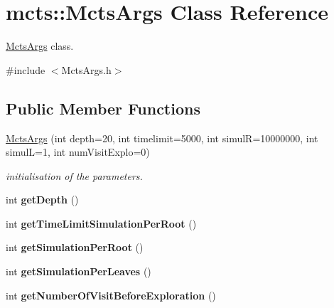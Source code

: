 \hypertarget{classmcts_1_1_mcts_args}{\section{mcts\+:\+:Mcts\+Args Class Reference}
\label{classmcts_1_1_mcts_args}
}


\hyperlink{classmcts_1_1_mcts_args}{Mcts\+Args} class.  




{\ttfamily \#include $<$Mcts\+Args.\+h$>$}

\subsection*{Public Member Functions}
\begin{DoxyCompactItemize}
\item 
\hyperlink{classmcts_1_1_mcts_args_a9bb463572768a550ac98a516ff785721}{Mcts\+Args} (int depth=20, int timelimit=5000, int simul\+R=10000000, int simul\+L=1, int num\+Visit\+Explo=0)
\begin{DoxyCompactList}\small\item\em initialisation of the parameters. \end{DoxyCompactList}\item 
\hypertarget{classmcts_1_1_mcts_args_a91c5f83242f98caca36bbc595d24a603}{int {\bfseries get\+Depth} ()}\label{classmcts_1_1_mcts_args_a91c5f83242f98caca36bbc595d24a603}

\item 
\hypertarget{classmcts_1_1_mcts_args_aa5f439f3b7bc032af73e14dcb1a875c9}{int {\bfseries get\+Time\+Limit\+Simulation\+Per\+Root} ()}\label{classmcts_1_1_mcts_args_aa5f439f3b7bc032af73e14dcb1a875c9}

\item 
\hypertarget{classmcts_1_1_mcts_args_ac9a97f5474d51aa0581af018bd4cd2a8}{int {\bfseries get\+Simulation\+Per\+Root} ()}\label{classmcts_1_1_mcts_args_ac9a97f5474d51aa0581af018bd4cd2a8}

\item 
\hypertarget{classmcts_1_1_mcts_args_a52cec8ab3c710a510ca1e0432a7be2e3}{int {\bfseries get\+Simulation\+Per\+Leaves} ()}\label{classmcts_1_1_mcts_args_a52cec8ab3c710a510ca1e0432a7be2e3}

\item 
\hypertarget{classmcts_1_1_mcts_args_ae1bdfb4d376aeae1b9aa1c4e2449e64a}{int {\bfseries get\+Number\+Of\+Visit\+Before\+Exploration} ()}\label{classmcts_1_1_mcts_args_ae1bdfb4d376aeae1b9aa1c4e2449e64a}

\end{DoxyCompactItemize}


